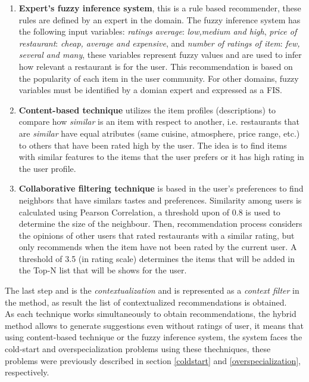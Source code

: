 \begin{enumerate} 
\item \textbf{Expert's fuzzy inference system}, 
this is a rule based recommender, these rules are defined by 
an expert in the domain. The
fuzzy inference system has the following input variables:
\textit{ratings average}:  \textit{low,medium and high}, \textit{price
of restaurant}:  \textit{cheap, average and expensive}, and
\textit{number of ratings of item}:  \textit{few, several and many},
these variables represent fuzzy values and are used to infer how
relevant a restaurant is for the  user. This recommendation is based
on the popularity of each  item in the user community. For other
domains, fuzzy variables must be identified by a domian expert and
expressed as a FIS.
\item \textbf{Content-based technique} 
utilizes the item profiles (descriptions) to compare how
\textit{similar} is an item with respect to  another, i.e. restaurants
that are \textit{similar} have equal atributes (same cuisine,  atmosphere, price range,
etc.) to others that have been rated high by the user.  The idea is to find items
with similar features to the items that the  user prefers or it has
high rating in the user profile. 
\item \textbf{Collaborative filtering technique} 
is based in the user's preferences  to find neighbors that
have similars tastes and preferences. Similarity among users is
calculated using Pearson Correlation, a threshold upon of 0.8 is used
to determine the size of the neighbour. Then, recommendation process
considers the opinions of other users that rated restaurants with a
similar rating, but only recommends when the item have not been rated
by the current user. A threshold of 3.5 (in rating scale) determines
the items that will be added in the Top-N list that will be shows for
the user. 
\end{enumerate}  
The last step and is the \textit{contextualization} and is
represented as a \textit{context filter} in the method, as result the
list of contextualized recommendations is obtained. \\ As each
technique works simultaneously to obtain recommendations, the hybrid
method allows to generate suggestions even without  ratings of user,
it means that using content-based technique or the fuzzy inference system, 
the system faces the cold-start and overspecialization
problems using these thechniques, these problems were previously
described in section \ref{coldstart} and \ref{overspecialization},
respectively.\\ 
